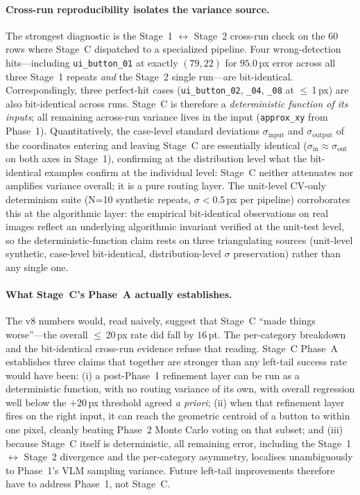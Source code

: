 \paragraph{Cross-run reproducibility isolates the variance source.}
The strongest diagnostic is the Stage~1 $\leftrightarrow$ Stage~2
cross-run check on the $60$ rows where Stage~C dispatched to a
specialized pipeline.  Four wrong-detection hits---including
\texttt{ui\_button\_01} at exactly $(79, 22)$ for $95.0$\,px error
across all three Stage~1 repeats \emph{and} the Stage~2 single
run---are bit-identical.  Correspondingly, three perfect-hit cases
(\texttt{ui\_button\_02}, \texttt{\_04}, \texttt{\_08} at
$\leq$\,1\,px) are also bit-identical across runs.  Stage~C is
therefore a \emph{deterministic function of its inputs}; all
remaining across-run variance lives in the input
(\texttt{approx\_xy} from Phase~1).  Quantitatively, the case-level
standard deviations $\sigma_{\text{input}}$ and
$\sigma_{\text{output}}$ of the coordinates entering and leaving
Stage~C are essentially identical ($\sigma_{\text{in}} \approx
\sigma_{\text{out}}$ on both axes in Stage~1), confirming at the
distribution level what the bit-identical examples confirm at the
individual level: Stage~C neither attenuates nor amplifies variance
overall; it is a pure routing layer.  The unit-level CV-only
determinism suite (N=10 synthetic repeats, $\sigma < 0.5$\,px per
pipeline) corroborates this at the algorithmic layer: the empirical
bit-identical observations on real images reflect an underlying
algorithmic invariant verified at the unit-test level, so the
deterministic-function claim rests on three triangulating sources
(unit-level synthetic, case-level bit-identical, distribution-level
$\sigma$ preservation) rather than any single one.

\paragraph{What Stage~C's Phase~A actually establishes.}
The v8 numbers would, read naively, suggest that Stage~C ``made
things worse''---the overall $\leq$\,20\,px rate did fall by
$16$\,pt.  The per-category breakdown and the bit-identical
cross-run evidence refuse that reading.  Stage~C Phase~A
establishes three claims that together are stronger than any
left-tail success rate would have been: (i) a post-Phase~1
refinement layer can be run as a deterministic function, with no
routing variance of its own, with overall regression well below the
$+20$\,px threshold agreed \emph{a priori}; (ii) when that
refinement layer fires on the right input, it can reach the
geometric centroid of a button to within one pixel, cleanly
beating Phase~2 Monte Carlo voting on that subset; and (iii)
because Stage~C itself is deterministic, all remaining error,
including the Stage~1 $\leftrightarrow$ Stage~2 divergence and the
per-category asymmetry, localises unambiguously to Phase~1's VLM
sampling variance.  Future left-tail improvements therefore have
to address Phase~1, not Stage~C.

